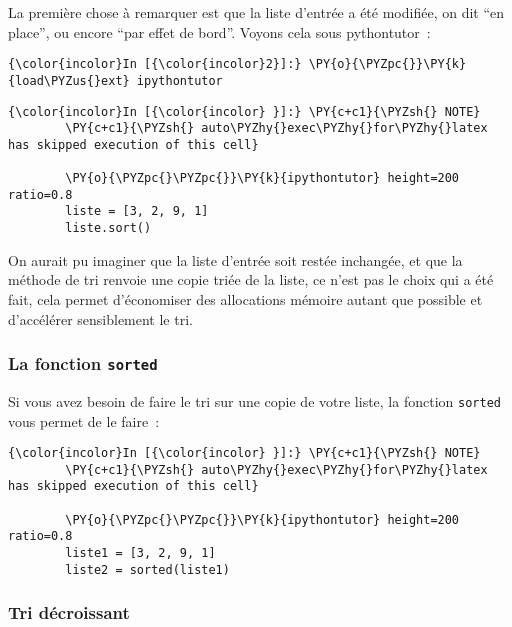     La première chose à remarquer est que la liste d'entrée a été modifiée,
on dit ``en place'', ou encore ``par effet de bord''. Voyons cela sous
pythontutor~:

    \begin{Verbatim}[commandchars=\\\{\}]
{\color{incolor}In [{\color{incolor}2}]:} \PY{o}{\PYZpc{}}\PY{k}{load\PYZus{}ext} ipythontutor
\end{Verbatim}


    \begin{Verbatim}[commandchars=\\\{\}]
{\color{incolor}In [{\color{incolor} }]:} \PY{c+c1}{\PYZsh{} NOTE}
        \PY{c+c1}{\PYZsh{} auto\PYZhy{}exec\PYZhy{}for\PYZhy{}latex has skipped execution of this cell}
        
        \PY{o}{\PYZpc{}\PYZpc{}}\PY{k}{ipythontutor} height=200 ratio=0.8
        liste = [3, 2, 9, 1]
        liste.sort()
\end{Verbatim}


    On aurait pu imaginer que la liste d'entrée soit restée inchangée, et
que la méthode de tri renvoie une copie triée de la liste, ce n'est pas
le choix qui a été fait, cela permet d'économiser des allocations
mémoire autant que possible et d'accélérer sensiblement le tri.

    \hypertarget{la-fonction-sorted}{%
\subsubsection{\texorpdfstring{La fonction
\texttt{sorted}}{La fonction sorted}}\label{la-fonction-sorted}}

    Si vous avez besoin de faire le tri sur une copie de votre liste, la
fonction \texttt{sorted} vous permet de le faire~:

    \begin{Verbatim}[commandchars=\\\{\}]
{\color{incolor}In [{\color{incolor} }]:} \PY{c+c1}{\PYZsh{} NOTE}
        \PY{c+c1}{\PYZsh{} auto\PYZhy{}exec\PYZhy{}for\PYZhy{}latex has skipped execution of this cell}
        
        \PY{o}{\PYZpc{}\PYZpc{}}\PY{k}{ipythontutor} height=200 ratio=0.8
        liste1 = [3, 2, 9, 1]
        liste2 = sorted(liste1)
\end{Verbatim}


    \hypertarget{tri-duxe9croissant}{%
\subsubsection{Tri décroissant}\label{tri-duxe9croissant}}

